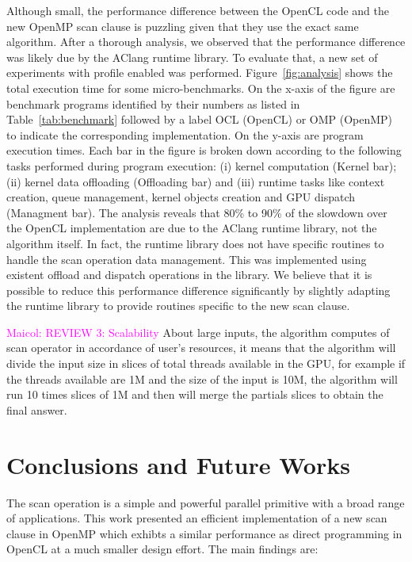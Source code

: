 \documentclass[Ingles]{ic-tese-v1}
\newcommand{\maicol}[1]{\noindent\textcolor{magenta}{Maicol: {#1}}}
\newcommand{\maicol}[1]{}
\newcommand{\rtab}[1]{Table~\ref{tab:#1}}
\begin{document}
Although small, the performance difference between the OpenCL code and
the new OpenMP  scan clause is puzzling given that  they use the exact
same   algorithm.  After a thorough analysis, we observed that the performance
difference was likely due by  the AClang runtime library.  To evaluate
that, a  new set of  experiments with profile enabled  was performed.
Figure~\ref{fig:analysis}  shows the  total  execution  time for  some
micro-benchmarks.  On the x-axis of  the figure are benchmark programs
identified by their numbers as  listed in \rtab{benchmark} followed by
a label  OCL (OpenCL)  or OMP (OpenMP)  to indicate  the corresponding
implementation. On the  y-axis are program execution  times.  Each bar
in  the  figure  is  broken  down according  to  the  following  tasks
performed  during program  execution: (i)  kernel computation  (Kernel
bar);  (ii) kernel  data offloading  (Offloading bar)  and (iii)  runtime
tasks like context creation, queue management, kernel objects creation
and GPU dispatch  (Managment bar).  The analysis reveals  that 80\% to
90\% of  the slowdown over  the OpenCL  implementation are due  to the
AClang  runtime  library, not  the  algorithm  itself.  In  fact,  the
runtime library  does not  have specific routines  to handle  the scan
operation  data management.   This was  implemented using  existent
offload and dispatch operations in the library.  We believe that it is
possible  to  reduce  this  performance  difference  significantly  by
slightly adapting the runtime library  to provide routines specific to
the new scan clause.

\maicol{REVIEW 3: Scalability}
About large inputs, the algorithm computes  of scan operator
in accordance of user's resources, it means that the algorithm will
divide the input size in slices of total threads available in the GPU,
for example if the threads available are 1M and the size of the input
is 10M, the algorithm will run 10 times slices of 1M and then will
merge the partials slices to obtain the final answer.

\chapter{Conclusions and Future Works}
\label{cap:Conclusion}

The scan operation is a simple  and powerful parallel primitive with a
broad  range  of  applications.   This  work  presented  an  efficient
implementation of a new scan clause in OpenMP which exhibts
a similar performance as direct programming in OpenCL at a much
smaller design effort. The main findings are:
\end{document}
